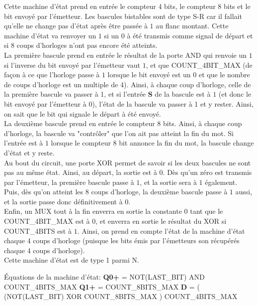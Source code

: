 \documentclass[a4paper]{article} %
\begin{document}
\begin{tcolorbox}[colframe=Monokaimagenta,colback=white]
Cette machine d'état prend en entrée le compteur 4 bits, le compteur 8 bits et le bit envoyé par l'émetteur. Les bascules bistables sont de type S-R car il fallait qu'elle ne change pas d'état après être passée à $1$ au flanc montant. Cette machine d'état va renvoyer un $1$ si un $0$ à été transmis comme signal de départ et si 8 coups d'horloges n'ont pas encore été atteints.\\
La première bascule prend en entrée le résultat de la porte AND qui renvoie un $1$ si l'inverse du bit envoyé par l'émetteur vaut $1$, et que COUNT\_4BIT\_MAX (de façon à ce que l'horloge passe à $1$ lorsque le bit envoyé est un $0$ et que le nombre de coups d'horloge est un multiple de 4). Ainsi, à chaque coup d'horloge, celle de la première bascule va passer à 1, et si l'entrée \textbf{S} de la bascule est à $1$ (et donc le bit envoyé par l'émetteur à $0$), l'état de la bascule va passer à 1 et y rester. Ainsi, on sait que le bit qui signale le départ à été envoyé.\\
La deuxième bascule prend en entrée le compteur 8 bits. Ainsi, à chaque coup d'horloge, la bascule va "contrôler" que l'on ait pas atteint la fin du mot. Si l'entrée est à $1$ lorsque le compteur 8 bit annonce la fin du mot, la bascule change d'état et y reste.\\
Au bout du circuit, une porte XOR permet de savoir si les deux bascules ne sont pas au même état.
Ainsi, au départ, la sortie est à 0. Dès qu'un zéro est transmis par l'émetteur, la première bascule passe à $1$, et la sortie sera à $1$ également. Puis, dès qu'on atteint les 8 coups d'horloge, la deuxième bascule passe à $1$ aussi, et la sortie passe donc définitivement à $0$.\\
Enfin, un MUX tout à la fin enverra en sortie la constante $0$ tant que le COUNT\_4BIT\_MAX est à $0$, et enverra en sortie le résultat du XOR si COUNT\_4BITS est à $1$. Ainsi, on prend en compte l'état de la machine d'état chaque 4 coups d'horloge (puisque les bits émis par l'émetteurs son récupérés chaque 4 coups d'horloge).\\
Cette machine d'état est de type 1 parmi N.

Équations de la machine d'état:
\textbf{Q0+} = NOT(LAST\_BIT) AND COUNT\_4BITS\_MAX
\textbf{Q1+} = COUNT\_8BITS\_MAX
\textbf{D} = ( (NOT(LAST\_BIT)  XOR COUNT\_8BITS\_MAX ) COUNT\_4BITS\_MAX


\end{tcolorbox}
\end{document}
